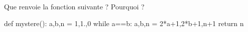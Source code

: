 \question{} Que renvoie la fonction suivante ? Pourquoi ? 
\begin{pyverbatim}
def mystere():
    a,b,n = 1,1.,0
    while a==b:
        a,b,n = 2*a+1,2*b+1,n+1
    return n
\end{pyverbatim}
